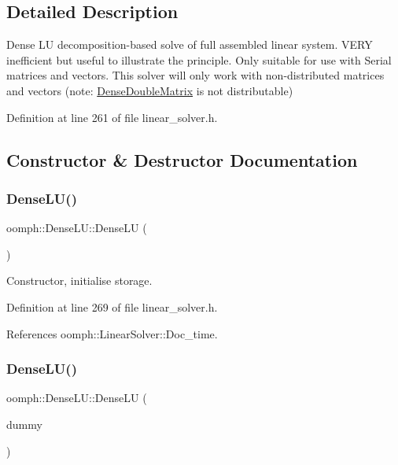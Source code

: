 \subsection{Detailed Description}
Dense LU decomposition-\/based solve of full assembled linear system. V\+E\+RY inefficient but useful to illustrate the principle. Only suitable for use with Serial matrices and vectors. This solver will only work with non-\/distributed matrices and vectors (note\+: \hyperlink{classoomph_1_1DenseDoubleMatrix}{Dense\+Double\+Matrix} is not distributable) 

Definition at line 261 of file linear\+\_\+solver.\+h.



\subsection{Constructor \& Destructor Documentation}
\mbox{\label{classoomph_1_1DenseLU_a7d8217ef310a5c5ad224e4e6aa40d923}} 
\subsubsection{\texorpdfstring{Dense\+L\+U()}{DenseLU()}\hspace{0.1cm}{\footnotesize\ttfamily [1/2]}}
{\footnotesize\ttfamily oomph\+::\+Dense\+L\+U\+::\+Dense\+LU (\begin{DoxyParamCaption}{ }\end{DoxyParamCaption})\hspace{0.3cm}{\ttfamily [inline]}}



Constructor, initialise storage. 



Definition at line 269 of file linear\+\_\+solver.\+h.



References oomph\+::\+Linear\+Solver\+::\+Doc\+\_\+time.

\mbox{\label{classoomph_1_1DenseLU_a5f0c2eb1cbe142498d12ae14e3cadca2}} 
\subsubsection{\texorpdfstring{Dense\+L\+U()}{DenseLU()}\hspace{0.1cm}{\footnotesize\ttfamily [2/2]}}
{\footnotesize\ttfamily oomph\+::\+Dense\+L\+U\+::\+Dense\+LU (\begin{DoxyParamCaption}\item[{const \hyperlink{classoomph_1_1DenseLU}{Dense\+LU} \&}]{dummy }\end{DoxyParamCaption})\hspace{0.3cm}{\ttfamily [inline]}}



